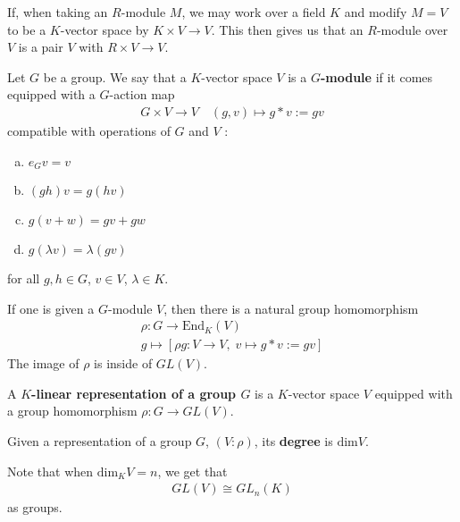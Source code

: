 \documentclass{memoir}
\begin{document}



If, when taking an \(R\)-module \(M\), we may work over a field \(K\) and modify \(M = V\) to be a \(K\)-vector space by \(K\times V\to V\). This then gives us that an \(R\)-module over \(V\) is a pair \(V\) with \(R\times V\to V\).

\begin{defn}
	Let \(G\) be a group. We say that a \(K\)-vector space \(V\) is a \textbf{\(G\)-module} if it comes equipped with a \(G\)-action map
	\begin{align*}
		G\times V \to V \quad (g,v) \mapsto g*v :=gv
	\end{align*}
	compatible with operations of \(G\) and \(V\) :
	\begin{enumerate}[(a).]
		\item \(e_G v = v\) 
		\item \((gh)v = g(hv)\) 
		\item \(g(v+w) = gv + gw\) 
		\item \(g(\lambda v) = \lambda (gv)\)
	\end{enumerate}
	for all \(g,h \in G\), \(v \in V\), \(\lambda \in K\).
\end{defn}
If one is given a \(G\)-module \(V\), then there is a natural group homomorphism
\begin{align*}
	\rho:G\to \textrm{End}_K(V)\\
	g\mapsto \left[ \rho g : V \to V , \; v\mapsto g * v := gv \right] 
\end{align*}
The image of \(\rho\) is inside of \(GL(V)\).

\begin{defn}
	A \textbf{\(K\)-linear representation of a group \(G\)} is a \(K\)-vector space \(V\) equipped with a group homomorphism \(\rho:G \to GL(V)\).
\end{defn}


\begin{defn}
	Given a representation of a group \(G\), \((V:\rho)\), its \textbf{degree} is \(\textrm{dim}V\).
\end{defn}
Note that when \(\textrm{dim}_KV=n\), we get that
\begin{align*}
	GL(V) \cong GL_n(K)
\end{align*}
as groups.
\end{document}
